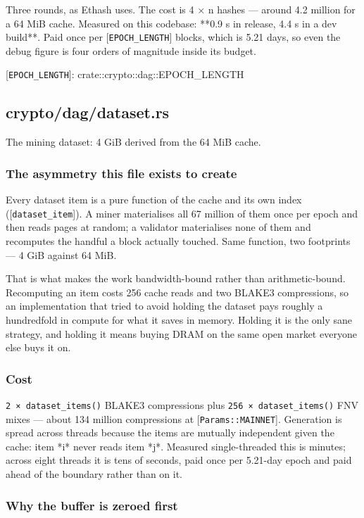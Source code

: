\documentclass[11pt,a4paper]{article}
\begin{document}
Three rounds, as Ethash uses. The cost is 4 × n hashes — around 4.2 million
for a 64 MiB cache. Measured on this codebase: **0.9 s in release, 4.4 s in
a dev build**. Paid once per [\texttt{EPOCH\_LENGTH}] blocks, which is 5.21 days, so
even the debug figure is four orders of magnitude inside its budget.

[\texttt{EPOCH\_LENGTH}]: crate::crypto::dag::EPOCH\_LENGTH

\subsection{crypto/dag/dataset.rs}
The mining dataset: 4 GiB derived from the 64 MiB cache.

\subsubsection{The asymmetry this file exists to create}

Every dataset item is a pure function of the cache and its own index
([\texttt{dataset\_item}]). A miner materialises all 67 million of them once per
epoch and then reads pages at random; a validator materialises none of them
and recomputes the handful a block actually touched. Same function, two
footprints — 4 GiB against 64 MiB.

That is what makes the work bandwidth-bound rather than arithmetic-bound.
Recomputing an item costs 256 cache reads and two BLAKE3 compressions, so an
implementation that tried to avoid holding the dataset pays roughly a
hundredfold in compute for what it saves in memory. Holding it is the only
sane strategy, and holding it means buying DRAM on the same open market
everyone else buys it on.

\subsubsection{Cost}

\texttt{2 × dataset\_items()} BLAKE3 compressions plus \texttt{256 × dataset\_items()} FNV
mixes — about 134 million compressions at [\texttt{Params::MAINNET}]. Generation is
spread across threads because the items are mutually independent given the
cache: item *i* never reads item *j*. Measured single-threaded this is
minutes; across eight threads it is tens of seconds, paid once per 5.21-day
epoch and paid ahead of the boundary rather than on it.

\subsubsection{Why the buffer is zeroed first}
\end{document}
